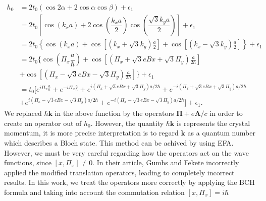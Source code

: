 \documentclass{report}
\newcommand{\f}[2]{\dfrac{#1}{#2}}
\begin{document}
\begin{equation}
	\begin{aligned}
		h_0
		 & = 2 t_0 \left(\cos2\alpha + 2\cos\alpha \cos\beta\right) + \epsilon_1                                                                                                                                     \\
		 & = 2t_{0} \left[ \cos(k_x a) + 2 \cos \left(\f{k_x a}{2}\right) \cos \left(\f{\sqrt{3}k_y a}{2}\right) \right] + \epsilon_1                                                                                \\
		 & = 2t_{0} \left\{ \cos(k_x a) + \cos\left[\left( k_{x} + \sqrt{3} k_{y} \right)\frac{a}{2}\right] + \cos\left[\left( k_{x} - \sqrt{3} k_{y} \right)\frac{a}{2}\right]\right\} + \epsilon_1                 \\
		 & = 2t_{0} \Biggl\{ \cos(\Pi_{x}\f{a}{\hbar}) + \cos \left[\left(\Pi_{x} + \sqrt{3} e B x + \sqrt{3} \Pi_{y}\right)\frac{a}{2\hbar}\right]                                                                  \\
		 & + \cos \left[\left(\Pi_{x} - \sqrt{3} e B x - \sqrt{3} \Pi_{y}\right)\frac{a}{2\hbar}\right] \Biggr\} + \epsilon_1                                                                                        \\
		 & = t_{0} \biggl[e^{i \Pi_{x}\frac{a}{\hbar}} + e^{-i\Pi_{x}\frac{a}{\hbar}} + e^{i(\Pi_{x} + \sqrt{3} eBx + \sqrt{3} \Pi_{y} ) a / 2\hbar} + e^{-i(\Pi_{x} + \sqrt{3} eBx + \sqrt{3} \Pi_{y} ) a / 2\hbar} \\
		 & + e^{i(\Pi_{x} - \sqrt{3} eBx - \sqrt{3} \Pi_{y} ) a / 2\hbar} + e^{-i(\Pi_{x} - \sqrt{3} eBx - \sqrt{3} \Pi_{y} ) a / 2\hbar} \biggr] + \epsilon_1.
	\end{aligned}
\end{equation}
We replaced $\hbar \mathbf{k}$ in the above function by the operators $\mathbf{\Pi} + e \mathbf{A} / c$ in order to create an operator out of $h_{0}$. However, the quantity $\hbar \mathbf{k}$ is represents the crystal momentum, it is more precise interpretation is to regard $\mathbf{k}$ as a quantum number which describes a Bloch state. This method can be achived by using \ac{EFA}. However, we must be very careful regarding how the operators act on the wave functions, since $\left[x,\Pi_{x}\right] \neq 0$. In their article, Gumbs and Fekete \cite{gumps1997}  incorrectly applied the modified translation operators, leading to completely incorrect results. In this work, we treat the operators more correctly by applying the \ac{BCH} formula and taking into account the commutation relation $\left[x,\Pi_{x}\right] = i \hbar$
\end{document}
